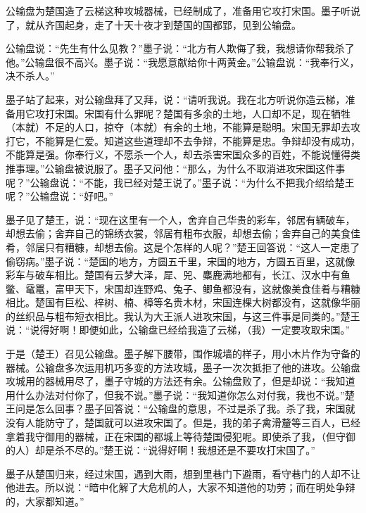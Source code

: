 \documentclass[12pt,UTF-8,openany,a4]{ctexbook}
\begin{document}
\vspace{1em}

\begin{large}
    \yiwen 
    公输盘为楚国造了云梯这种攻城器械，已经制成了，准备用它攻打宋国。墨子听说了，就从齐国起身，走了十天十夜才到楚国的国都郢，见到公输盘。
    
    公输盘说：“先生有什么见教？”墨子说：“北方有人欺侮了我，我想请你帮我杀了他。”公输盘很不高兴。墨子说：“我愿意献给你十两黄金。”公输盘说：“我奉行义，决不杀人。”
    
    墨子站了起来，对公输盘拜了又拜，说：“请听我说。我在北方听说你造云梯，准备用它攻打宋国。宋国有什么罪呢？楚国有多余的土地，人口却不足，现在牺牲（本就）不足的人口，掠夺（本就）有余的土地，不能算是聪明。宋国无罪却去攻打它，不能算是仁爱。知道这些道理却不去争辩，不能算是忠。争辩却没有成功，不能算是强。你奉行义，不愿杀一个人，却去杀害宋国众多的百姓，不能说懂得类推事理。”公输盘被说服了。墨子又问他：“那么，为什么不取消进攻宋国这件事呢？”公输盘说：“不能，我已经对楚王说了。”墨子说：“为什么不把我介绍给楚王呢？”公输盘说：“好吧。”
    
    墨子见了楚王，说：“现在这里有一个人，舍弃自己华贵的彩车，邻居有辆破车，却想去偷；舍弃自己的锦绣衣裳，邻居有粗布衣服，却想去偷；舍弃自己的美食佳肴，邻居只有糟糠，却想去偷。这是个怎样的人呢？”楚王回答说：“这人一定患了偷窃病。”墨子说：“楚国的地方，方圆五千里，宋国的地方，方圆五百里，这就像彩车与破车相比。楚国有云梦大泽，犀、兕、麋鹿满地都有，长江、汉水中有鱼鳖、鼋鼍，富甲天下，宋国却连野鸡、兔子、鲫鱼都没有，这就像美食佳肴与糟糠相比。楚国有巨松、梓树、楠、樟等名贵木材，宋国连棵大树都没有，这就像华丽的丝织品与粗布短衣相比。我认为大王派人进攻宋国，与这三件事是同类的。”楚王说：“说得好啊！即便如此，公输盘已经给我造了云梯，（我）一定要攻取宋国。”
    
    于是（楚王）召见公输盘。墨子解下腰带，围作城墙的样子，用小木片作为守备的器械。公输盘多次运用机巧多变的方法攻城，墨子一次次抵拒了他的进攻。公输盘攻城用的器械用尽了，墨子守城的方法还有余。公输盘败了，但是却说：“我知道用什么办法对付你了，但我不说。”墨子说：“我知道你怎么对付我，我也不说。”楚王问是怎么回事？墨子回答说：“公输盘的意思，不过是杀了我。杀了我，宋国就没有人能防守了，楚国就可以进攻宋国了。但是，我的弟子禽滑釐等三百人，已经拿着我守御用的器械，正在宋国的都城上等待楚国侵犯呢。即使杀了我，（但守御的人）却是杀不尽的。”楚王说：“说得好啊！我想还是不要攻打宋国了。”
    
    墨子从楚国归来，经过宋国，遇到大雨，想到里巷门下避雨，看守巷门的人却不让他进去。所以说：“暗中化解了大危机的人，大家不知道他的功劳；而在明处争辩的，大家都知道。”
    
\end{large}
\end{document}
